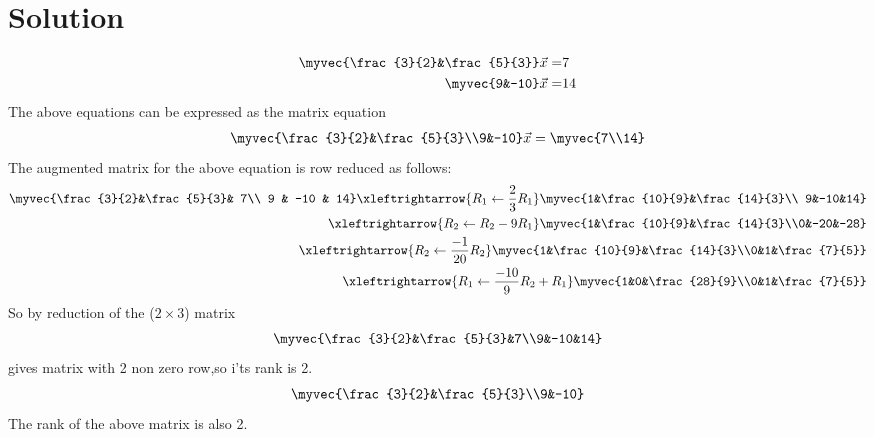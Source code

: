 \documentclass[journal,12pt,twocolumn]{IEEEtran}
\begin{document}
\section{Solution}
\begin{align}
    \myvec{\frac{3}{2}&\frac{5}{3}}\vec{x}=&7\\
    \myvec{9&-10}\vec{x}=&14
\end{align}
The above equations can be expressed as the matrix equation
\begin{align}
     \myvec{\frac{3}{2}&\frac{5}{3}\\9&-10}\vec{x}=\myvec{7\\14}
\end{align}
The augmented matrix for the above equation
is row reduced as follows:
\begin{align}
     \myvec{\frac{3}{2}&\frac{5}{3}& 7\\
           9 & -10 & 14}
          \xleftrightarrow{R_1 \leftarrow\frac{2}{3}{R_1}}
    \myvec{1&\frac{10}{9}&\frac{14}{3}\\
        9&-10&14}\\
        \xleftrightarrow{R_2\leftarrow R_2 -9R_1}
    \myvec{1&\frac{10}{9}&\frac{14}{3}\\0&-20&-28}\\
    \xleftrightarrow{R_2\leftarrow \frac{-1}{20}{R_2}}
    \myvec{1&\frac{10}{9}&\frac{14}{3}\\0&1&\frac{7}{5}}\\
    \xleftrightarrow{R_1\leftarrow \frac{-10}{9}R_2+R_1}
    \myvec{1&0&\frac{28}{9}\\0&1&\frac{7}{5}}
    \end{align}
 So by reduction of the ($2\times3$) matrix
 \begin{align}
     \myvec{\frac{3}{2}&\frac{5}{3}&7\\9&-10&14}
 \end{align}
 gives matrix with 2 non zero row,so i'ts rank is 2. 
   \begin{align}
       \myvec{\frac{3}{2}&\frac{5}{3}\\9&-10}
   \end{align} 
  The rank of the above matrix is also 2.
   
\end{document}
